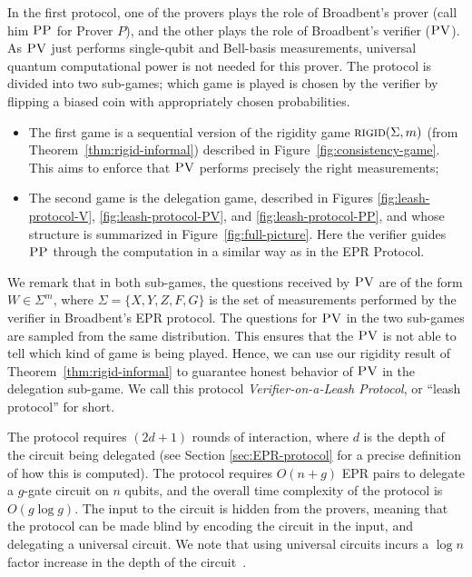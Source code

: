 In the first protocol, one of the provers plays the role of Broadbent's prover
(call him $\textsc{PP}$ for Prover $P$), and the other plays the role of Broadbent's
verifier ($\textsc{PV}$). As $\textsc{PV}$  just performs
single-qubit and Bell-basis measurements, universal quantum
computational power is not needed for this prover.
The protocol is divided into two sub-games; which game is played is chosen by the verifier by flipping a biased coin with appropriately chosen probabilities.
\begin{itemize}[nolistsep]
\item The first game is a sequential version of the rigidity game $\textsc{rigid}(\Sigma,m)$ (from Theorem~\ref{thm:rigid-informal}) described in Figure~\ref{fig:consistency-game}. This aims to enforce that $\textsc{PV}$ performs precisely the right measurements;
\item The second game is the delegation game, described in Figures \ref{fig:leash-protocol-V}, \ref{fig:leash-protocol-PV}, and \ref{fig:leash-protocol-PP}, and whose structure is summarized in Figure~\ref{fig:full-picture}. Here the verifier guides $\textsc{PP}$ through the computation in a similar way as in the EPR Protocol.
\end{itemize}

We remark that in both sub-games, the questions received by $\textsc{PV}$ are of the form $W\in \Sigma^m$, where $\Sigma = \{X,Y,Z,F,G\}$ is the set of measurements performed by the verifier in Broadbent's EPR protocol. 
The questions for $\textsc{PV}$ in the two sub-games are sampled from the same distribution. This ensures that the $\textsc{PV}$ is not able to tell which kind of game is being played. Hence, we can use our rigidity result of Theorem~\ref{thm:rigid-informal} to guarantee honest behavior of $\textsc{PV}$ in the delegation sub-game. 
We call this protocol \emph{Verifier-on-a-Leash
Protocol}, or ``leash protocol'' for short.

The protocol requires $(2d+1)$ rounds of interaction, where $d$ is the depth of the circuit being delegated (see Section \ref{sec:EPR-protocol} for a precise definition of how this is computed). %
The protocol requires $O(n+g)$ EPR pairs to delegate a $g$-gate circuit on $n$ qubits, and the overall time complexity of the protocol is $O(g\log g)$.
The input to the circuit is hidden from the provers, meaning that the protocol can be made blind by encoding the circuit in the input, and delegating a universal circuit. We note that using universal circuits incurs a $\log{n}$ factor increase in the depth of the circuit~\cite{BeraFGH10}.

